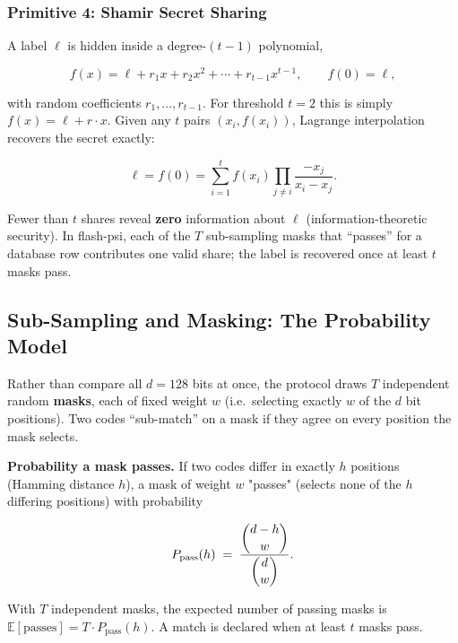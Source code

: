 \documentclass[11pt]{article}
\begin{document}
\subsubsection{Primitive 4: Shamir Secret Sharing}

A label $\ell$ is hidden inside a degree-$(t-1)$ polynomial,

\begin{equation}
f(x) = \ell + r_1 x + r_2 x^2 + \cdots + r_{t-1}x^{t-1}, \qquad f(0) = \ell,
\end{equation}

with random coefficients $r_1,\ldots,r_{t-1}$. For threshold $t=2$ this is simply
$f(x) = \ell + r\cdot x$. Given any $t$ pairs $(x_i, f(x_i))$, Lagrange interpolation
recovers the secret exactly:

\begin{equation}
\ell = f(0) = \sum_{i=1}^{t} f(x_i) \prod_{j \neq i} \frac{-x_j}{x_i - x_j} .
\end{equation}

Fewer than $t$ shares reveal \textbf{zero} information about $\ell$
(information-theoretic security). In flash-psi, each of the $T$ sub-sampling masks that
``passes'' for a database row contributes one valid share; the label is recovered once at
least $t$ masks pass.

\subsection{Sub-Sampling and Masking: The Probability Model}

Rather than compare all $d=128$ bits at once, the protocol draws $T$ independent random
\textbf{masks}, each of fixed weight $w$ (i.e.\ selecting exactly $w$ of the $d$ bit
positions). Two codes ``sub-match'' on a mask if they agree on every position the mask
selects.

\textbf{Probability a mask passes.} If two codes differ in exactly $h$ positions (Hamming
distance $h$), a mask of weight $w$ "passes" (selects none of the $h$ differing positions)
with probability

\begin{equation}
P_{\text{pass}}(h) \;=\; \frac{\dbinom{d-h}{w}}{\dbinom{d}{w}} .
\end{equation}

With $T$ independent masks, the expected number of passing masks is
$\mathbb{E}[\text{passes}] = T \cdot P_{\text{pass}}(h)$. A match is declared when at least
$t$ masks pass.
\end{document}
